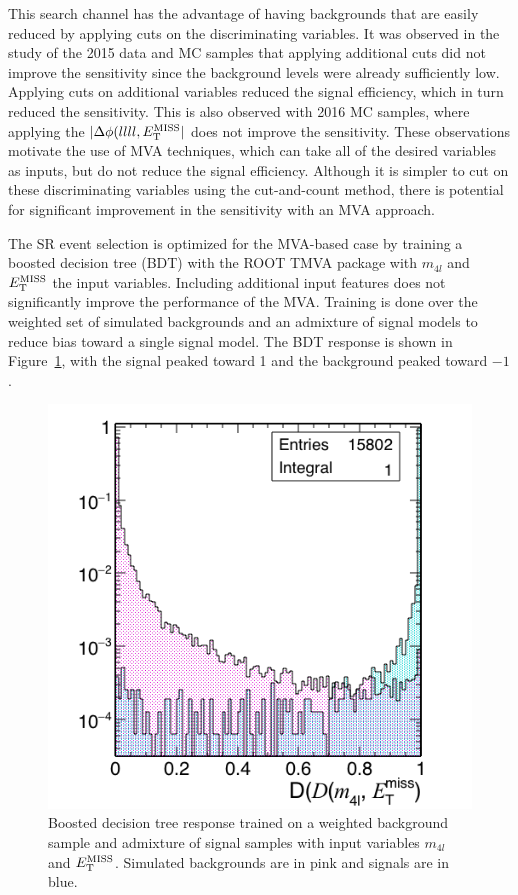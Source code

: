 This search channel has the advantage of having backgrounds that are easily reduced by applying cuts on the discriminating variables. It was observed in the study of the 2015 data and MC samples that applying additional cuts did not improve the sensitivity since the background levels were already sufficiently low. Applying cuts on additional variables reduced the signal efficiency, which in turn reduced the sensitivity. This is also observed with 2016 MC samples, where applying the $|\Delta\phi(llll, E_{\rm{T}}^{\rm{MISS}}|$ does not improve the sensitivity. These observations motivate the use of MVA techniques, which can take all of the desired variables as inputs, but do not reduce the signal efficiency. Although it is simpler to cut on these discriminating variables using the cut-and-count method, there is potential for significant improvement in the sensitivity with an MVA approach.

The SR event selection is optimized for the MVA-based case by training a boosted decision tree (BDT) with the ROOT TMVA package with $m_{4l}$ and $E_{\rm{T}}^{\rm{MISS}}$ the input variables. Including additional input features does not significantly improve the performance of the MVA. Training is done over the weighted set of simulated backgrounds and an admixture of signal models to reduce bias toward a single signal model. The BDT response is shown in Figure~\ref{fig:bdt}, with the signal peaked toward 1 and the background peaked toward $-1$. 

\begin{figure}[tbh]
\centering
\includegraphics[width=5in]{figures/f_Dm4lmet_1D_log.png}
\caption{Boosted decision tree response trained on a weighted background sample and admixture of signal samples with input variables $m_{4l}$ and $E_{\rm{T}}^{\rm{MISS}}$. Simulated backgrounds are in pink and signals are in blue.}
\label{fig:bdt}
\end{figure}

